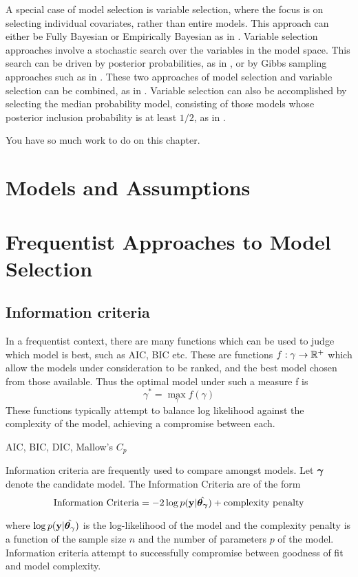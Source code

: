 \documentclass{amsart}[12pt]
\newcommand{\mgc}[1]{{\color{blue}#1}}
\begin{document}
A special case of model selection is variable selection, where the focus is on selecting individual
covariates, rather than entire models. This approach can either be Fully Bayesian or Empirically Bayesian as
in \citep{Cui2008}. Variable selection approaches involve a stochastic search over the variables in the model
space. This search can be driven by posterior probabilities, as in \citep{Casella2006}, or by Gibbs sampling
approaches such as in \citep{George1993}. These two approaches of model selection and variable selection can
be combined, as in \citep{Geweke1996}. Variable selection can also be accomplished by selecting the median
probability model, consisting of those models whose posterior inclusion probability is at least $1/2$, as in
\citep{Barbieri2004}.


\mgc{You have so much work to do on this chapter.}

\section{Models and Assumptions}

\section{Frequentist Approaches to Model Selection}
\subsection{Information criteria}


In a frequentist context, there are many functions which can be used to judge which model is best,
such as AIC, BIC etc. These are functions $f: \gamma \to {\mathbb{R}}^+$ which allow the models under consideration to
be ranked, and the best model chosen from those available. Thus the optimal model under such a measure
f is
\[
	\gamma^* = \max_\gamma f(\gamma)
\]
These functions typically attempt to balance log likelihood against the complexity of the model, achieving
a compromise between each.

\mgc{AIC, BIC, DIC, Mallow's $C_p$}


Information criteria are frequently used to compare amongst models. Let ${\boldsymbol \gamma}$ denote the candidate model.
The Information Criteria are of the form
\[
\text{Information Criteria} = -2 \log p({\bf y} | \hat{{\boldsymbol \theta}_{\boldsymbol \gamma}}) + \text{complexity penalty}
\]

where $\log p({\bf y} | \hat{{\boldsymbol \theta}_\gamma})$ is the log-likelihood of the model and the complexity penalty is
a function of the sample size $n$ and the number of parameters $p$ of the model. Information criteria attempt
to successfully compromise between goodness of fit and model complexity.
\end{document}
